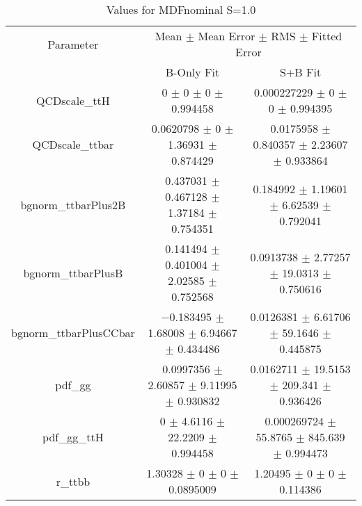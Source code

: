 \begin{table}
\centering
\caption{Values for MDFnominal S=1.0}
\begin{tabular}{ccc}
\toprule
Parameter & \multicolumn{2}{c}{Mean $\pm$ Mean Error $\pm$ RMS $\pm$ Fitted Error}\\
 & B-Only Fit & S+B Fit\\
\midrule
QCDscale\_ttH & \num{0} $\pm$ \num{0} $\pm$ \num{0} $\pm$ \num{0.994458} & \num{0.000227229} $\pm$ \num{0} $\pm$ \num{0} $\pm$ \num{0.994395}\\
QCDscale\_ttbar & \num{0.0620798} $\pm$ \num{0} $\pm$ \num{1.36931} $\pm$ \num{0.874429} & \num{0.0175958} $\pm$ \num{0.840357} $\pm$ \num{2.23607} $\pm$ \num{0.933864}\\
bgnorm\_ttbarPlus2B & \num{0.437031} $\pm$ \num{0.467128} $\pm$ \num{1.37184} $\pm$ \num{0.754351} & \num{0.184992} $\pm$ \num{1.19601} $\pm$ \num{6.62539} $\pm$ \num{0.792041}\\
bgnorm\_ttbarPlusB & \num{0.141494} $\pm$ \num{0.401004} $\pm$ \num{2.02585} $\pm$ \num{0.752568} & \num{0.0913738} $\pm$ \num{2.77257} $\pm$ \num{19.0313} $\pm$ \num{0.750616}\\
bgnorm\_ttbarPlusCCbar & \num{-0.183495} $\pm$ \num{1.68008} $\pm$ \num{6.94667} $\pm$ \num{0.434486} & \num{0.0126381} $\pm$ \num{6.61706} $\pm$ \num{59.1646} $\pm$ \num{0.445875}\\
pdf\_gg & \num{0.0997356} $\pm$ \num{2.60857} $\pm$ \num{9.11995} $\pm$ \num{0.930832} & \num{0.0162711} $\pm$ \num{19.5153} $\pm$ \num{209.341} $\pm$ \num{0.936426}\\
pdf\_gg\_ttH & \num{0} $\pm$ \num{4.6116} $\pm$ \num{22.2209} $\pm$ \num{0.994458} & \num{0.000269724} $\pm$ \num{55.8765} $\pm$ \num{845.639} $\pm$ \num{0.994473}\\
r\_ttbb & \num{1.30328} $\pm$ \num{0} $\pm$ \num{0} $\pm$ \num{0.0895009} & \num{1.20495} $\pm$ \num{0} $\pm$ \num{0} $\pm$ \num{0.114386}\\
\bottomrule
\end{tabular}
\end{table}